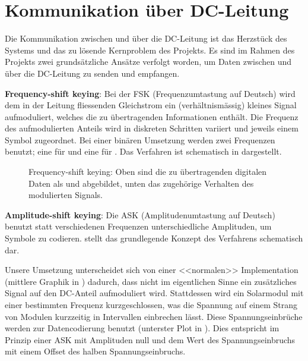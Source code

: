 \clearpage
\section{Kommunikation \"uber DC-Leitung}
\label{sec:commDCLine}

Die Kommunikation zwischen  \Sensor und \Master \"uber die  DC-Leitung ist das
Herzst\"uck des Systems und das zu l\"osende Kernproblem des Projekts. Es sind
im Rahmen  des Projekts  zwei grunds\"atzliche  Ans\"atze verfolgt  worden, um
Daten  zwischen  \Sensor und  \Master  \"uber  die  DC-Leitung zu  senden  und
empfangen.

\textbf{Frequency-shift keying}: Bei  der FSK (Frequenzumtastung  auf Deutsch)
wird  dem in  der Leitung  fliessenden Gleichstrom  ein (verh\"altnism\"assig)
kleines  Signal aufmoduliert,  welches  die  zu \"ubertragenden  Informationen
enth\"alt. Die  Frequenz   des  aufmodulierten   Anteils  wird   in  diskreten
Schritten variiert  und jeweils  einem Symbol zugeordnet. Bei  einer bin\"aren
Umsetzung  werden  zwei  Frequenzen  benutzt; eine  f\"ur    und  eine
f\"ur  .   Das  Verfahren ist  schematisch  in  
dargestellt.

\begin{figure}[h!tb]
    \centering
    
    \caption[Frequency-Shift keying]{%
        Frequency-shift  keying: Oben sind  die  zu \"ubertragenden  digitalen
        Daten  als   und   abgebildet, unten  das zugeh\"orige
        Verhalten des modulierten Signals.%
    }
    \label{fig:fsk:concept}
\end{figure}


\textbf{Amplitude-shift  keying}: Die  ASK (Amplitudenumtastung  auf  Deutsch)
benutzt statt verschiedenen Frequenzen unterschiedliche Amplituden, um Symbole
zu  codieren.    stellt  das  grundlegende  Konzept  des
Verfahrens schematisch dar.

Unsere  Umsetzung unterscheidet  sich  von  einer <<normalen>>   Implementation
(mittlere   Graphik  in   )  dadurch,   dass  nicht   im
eigentlichen Sinne  ein zus\"atzliches  Signal auf den  DC-Anteil aufmoduliert
wird. Stattdessen   wird  ein   Solarmodul  mit   einer  bestimmten   Frequenz
kurzgeschlossen,  was die  Spannung auf  einem Strang  von Modulen  kurzzeitig
in  Intervallen  einbrechen  l\"asst. Diese  Spannungseinbr\"uche  werden  zur
Datencodierung  benutzt   (unterster  Plot   in  ). Dies
entspricht  im  Prinzip  einer  ASK  mit Amplituden  null  und  dem  Wert  des
Spannungseinbruchs mit einem Offset des halben Spannungseinbruchs.

